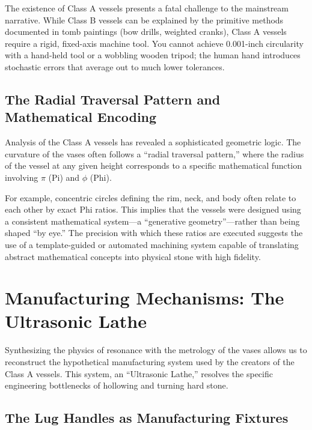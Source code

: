 \documentclass[11pt]{article}
\begin{document}
The existence of Class A vessels presents a fatal challenge to the mainstream narrative. While Class B vessels can be explained by the primitive methods documented in tomb paintings (bow drills, weighted cranks), Class A vessels require a rigid, fixed-axis machine tool. You cannot achieve 0.001-inch circularity with a hand-held tool or a wobbling wooden tripod; the human hand introduces stochastic errors that average out to much lower tolerances.

\subsection{The Radial Traversal Pattern and Mathematical Encoding}

Analysis of the Class A vessels has revealed a sophisticated geometric logic. The curvature of the vases often follows a ``radial traversal pattern,'' where the radius of the vessel at any given height corresponds to a specific mathematical function involving $\pi$ (Pi) and $\phi$ (Phi).

For example, concentric circles defining the rim, neck, and body often relate to each other by exact Phi ratios. This implies that the vessels were designed using a consistent mathematical system---a ``generative geometry''---rather than being shaped ``by eye.'' The precision with which these ratios are executed suggests the use of a template-guided or automated machining system capable of translating abstract mathematical concepts into physical stone with high fidelity.

\section{Manufacturing Mechanisms: The Ultrasonic Lathe}

Synthesizing the physics of resonance with the metrology of the vases allows us to reconstruct the hypothetical manufacturing system used by the creators of the Class A vessels. This system, an ``Ultrasonic Lathe,'' resolves the specific engineering bottlenecks of hollowing and turning hard stone.

\subsection{The Lug Handles as Manufacturing Fixtures}
\end{document}
